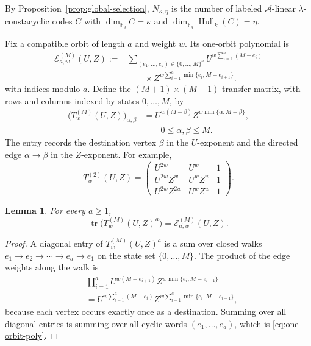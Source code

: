 \documentclass[preprint,12pt,a4paper]{elsarticle}
\newcommand{\F}{\mathbb F}
\newcommand{\A}{\mathcal A}
\newcommand{\Epoly}{\mathscr E}
\newcommand{\Hull}{\operatorname{Hull}}
\newtheorem{lemma}[theorem]{Lemma}
\theoremstyle{definition}
\theoremstyle{remark}
\begin{document}
By Proposition~\ref{prop:global-selection}, $N_{\kappa,\eta}$ is the number of
labeled $\A$-linear $\lambda$-constacyclic codes $C$ with
$\dim_{\F_q}C=\kappa$ and $\dim_{\F_q}\Hull_k(C)=\eta$.

Fix a compatible orbit of length $a$ and weight $w$.  Its one-orbit polynomial
is
\begin{equation}\label{eq:one-orbit-poly}
\begin{split}
\Epoly_{a,w}^{(M)}(U,Z)
:={}&\sum_{(e_1,\ldots,e_a)\in\{0,\ldots,M\}^a}
U^{w\sum_{i=1}^{a}(M-e_i)}\\
&\qquad {}\times
Z^{w\sum_{i=1}^{a}\min\{e_i,M-e_{i+1}\}}.
\end{split}
\end{equation}
with indices modulo $a$.  Define the $(M+1)\times(M+1)$ transfer matrix, with rows
and columns indexed by states $0,\ldots,M$, by
\begin{equation}\label{eq:transfer}
\begin{aligned}
\bigl(T^{(M)}_w(U,Z)\bigr)_{\alpha,\beta}
&= U^{w(M-\beta)}
   Z^{w\min\{\alpha,M-\beta\}},\\
&\qquad 0\leq \alpha,\beta\leq M.
\end{aligned}
\end{equation}
The entry records the destination vertex $\beta$ in the $U$-exponent and the
directed edge $\alpha\to\beta$ in the $Z$-exponent.  For example,
\[
T^{(2)}_w(U,Z)=
\begin{pmatrix}
U^{2w} & U^w & 1\\
U^{2w}Z^w & U^wZ^w & 1\\
U^{2w}Z^{2w} & U^wZ^w & 1
\end{pmatrix}.
\]

\begin{lemma}\label{lem:trace}
For every $a\geq1$,
\[
\operatorname{tr}\bigl(T^{(M)}_w(U,Z)^a\bigr)
   =\Epoly_{a,w}^{(M)}(U,Z).
\]
\end{lemma}

\begin{proof}
A diagonal entry of $T^{(M)}_w(U,Z)^a$ is a sum over closed walks
$e_1\to e_2\to\cdots\to e_a\to e_1$ on the state set $\{0,\ldots,M\}$.
The product of the edge weights along the walk is
\[
\begin{aligned}
&\prod_{i=1}^{a}
U^{w(M-e_{i+1})}
Z^{w\min\{e_i,M-e_{i+1}\}}\\
&=U^{w\sum_{i=1}^{a}(M-e_i)}
Z^{w\sum_{i=1}^{a}\min\{e_i,M-e_{i+1}\}},
\end{aligned}
\]
because each vertex occurs exactly once as a destination.  Summing over all
diagonal entries is summing over all cyclic words $(e_1,\ldots,e_a)$, which is
\eqref{eq:one-orbit-poly}.
\end{proof}
\end{document}
